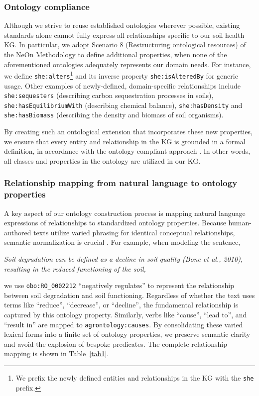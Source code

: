 \documentclass[preprint,12pt]{elsarticle}
\begin{document}
\subsubsection{Ontology compliance}
Although we strive to reuse established ontologies wherever possible, existing standards alone cannot fully express all relationships specific to our soil health KG. In particular, we adopt Scenario 8 (Restructuring ontological resources) of the NeOn Methodology to define additional properties, when none of the aforementioned ontologies adequately represents our domain needs. For instance, we define \texttt{she:alters}\footnote{We prefix the newly defined entities and relationships in the KG with the \texttt{she} prefix.} and its inverse property \texttt{she:isAlteredBy} for generic usage. Other examples of newly-defined, domain-specific relationships include \texttt{she:sequesters} (describing carbon sequestration processes in soils), \texttt{she:hasEquilibriumWith} (describing chemical balance), \texttt{she:hasDensity} and \texttt{she:hasBiomass} (describing the density and biomass of soil organisms).

By creating such an ontological extension that incorporates these new properties, we ensure that every entity and relationship in the KG is grounded in a formal definition, in accordance with the ontology-compliant approach \citep{10.1007/978-3-031-43458-7_48}. In other words, all classes and properties in the ontology are utilized in our KG.

\subsubsection{Relationship mapping from natural language to ontology properties} \label{sec3_2_2}
A key aspect of our ontology construction process is mapping natural language expressions of relationships to standardized ontology properties. Because human-authored texts utilize varied phrasing for identical conceptual relationships, semantic normalization is crucial \citep{carta2023iterativezeroshotllmprompting}. For example, when modeling the sentence,

\textit{Soil degradation can be defined as a decline in soil quality (Bone et al., 2010), resulting in the reduced functioning of the soil,}

\noindent we use \texttt{obo:RO\_0002212} ``negatively regulates'' to represent the relationship between soil degradation and soil functioning. Regardless of whether the text uses terms like ``reduce'', ``decrease'', or ``decline'', the fundamental relationship is captured by this ontology property. Similarly, verbs like ``cause'', ``lead to'', and ``result in'' are mapped to \texttt{agrontology:causes}. By consolidating these varied lexical forms into a finite set of ontology properties, we preserve semantic clarity and avoid the explosion of bespoke predicates. The complete relationship mapping is shown in Table~\ref{tab1}.
\end{document}
